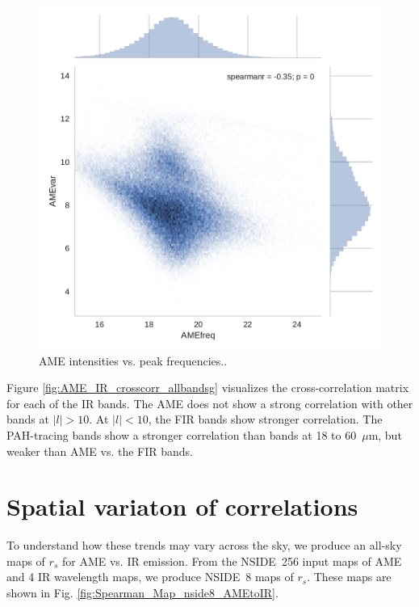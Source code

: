 \begin{figure}
         \includegraphics[width=\textwidth/3]{../Plots/ch_allsky/AMEfreq_vs_var.pdf}
         \centering
         \caption{AME intensities vs. peak frequencies..}
         \label{fig:AMEfreq_vs_int}
       \end{figure}

     Figure \ref{fig:AME_IR_crosscorr_allbandsg} visualizes the cross-correlation matrix for each of the IR bands. The AME does not show a strong correlation with other bands at $|l|>10$. At $|l|<10$, the FIR bands show stronger correlation. The PAH-tracing bands show a stronger correlation than bands at 18 to 60~$\mu$m, but weaker than AME vs. the FIR bands.

  \section{Spatial variaton of correlations}
    To understand how these trends may vary across the sky, we produce an all-sky maps of $r_{s}$ for AME vs. IR emission. From the NSIDE~256 input maps of AME and 4 IR wavelength maps, we produce NSIDE~8 maps of $r_{s}$. These maps are shown in Fig. \ref{fig:Spearman_Map_nside8_AMEtoIR}.




